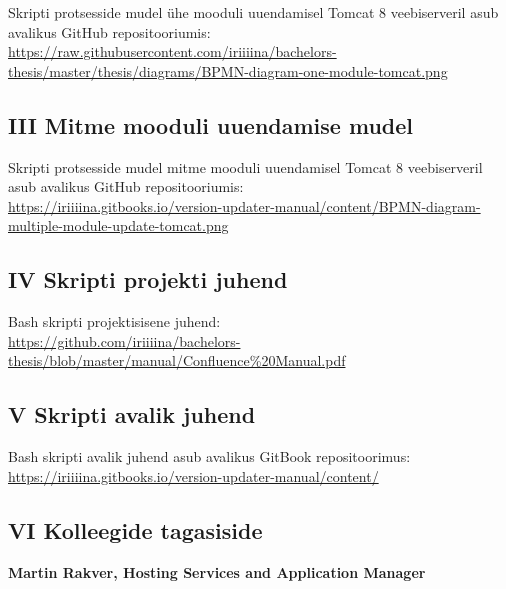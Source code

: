 \documentclass[12pt]{article}
\begin{document}
  Skripti protsesside mudel ühe mooduli uuendamisel Tomcat 8 veebiserveril asub avalikus GitHub repositooriumis:\\
  \url{https://raw.githubusercontent.com/iriiiina/bachelors-thesis/master/thesis/diagrams/BPMN-diagram-one-module-tomcat.png}
  
  \subsection*{III Mitme mooduli uuendamise mudel}
  \label{bpmn-many}
  
  Skripti protsesside mudel mitme mooduli uuendamisel Tomcat 8 veebiserveril asub avalikus GitHub repositooriumis:\\
  \url{https://iriiiina.gitbooks.io/version-updater-manual/content/BPMN-diagram-multiple-module-update-tomcat.png}
  
  \subsection*{IV Skripti projekti juhend}
  \label{documentation}
  
  Bash skripti projektisisene juhend:\\
  \url{https://github.com/iriiiina/bachelors-thesis/blob/master/manual/Confluence%20Manual.pdf}
  
  \subsection*{V Skripti avalik juhend}
  \label{public-documentation}
  
  Bash skripti avalik juhend asub avalikus GitBook repositoorimus:\\
  \url{https://iriiiina.gitbooks.io/version-updater-manual/content/}
  
  \subsection*{VI Kolleegide tagasiside}
  \label{feedback}
  
  \textbf{Martin Rakver, Hosting Services and Application Manager}
  
\end{document}
